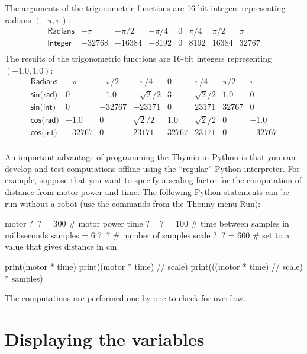 \documentclass[11pt,a4paper]{article}
\newcommand*{\bu}[1]{\textsf{\small #1}}
\begin{document}
The arguments of the trigonometric functions are 16-bit integers representing radians $(-\pi,\pi)$:
\[
\renewcommand*{\arraystretch}{1.3}
\begin{array}{lccccccc}
\textsf{Radians}&-\pi&-\pi/2&-\pi/4&0&\pi/4&\pi/2&\pi\\\hline
\textsf{Integer}&-32768&-16384&-8192&0&8192&16384&32767\\
\end{array}
\]
The results of the trigonometric functions are 16-bit integers representing $(-1.0,1.0)$:
\[
\renewcommand*{\arraystretch}{1.3}
\begin{array}{lccccccc}
\textsf{Radians}&-\pi&-\pi/2&-\pi/4&0&\pi/4&\pi/2&\pi\\\hline
\textsf{sin(rad)} & 0 & -1.0 & -\sqrt{2}/{2} & 3 & \sqrt{2}/{2} & 1.0& 0\\
\textsf{sin(int)}&0&-32767&-23171&0&23171&32767&0\\\hline
\textsf{cos(rad)} & -1.0 & 0 & \sqrt{2}/{2} & 1.0 & \sqrt{2}/{2} & 0& -1.0\\
\textsf{cos(int)}&-32767&0&23171&32767&23171&0&-32767\\
\end{array}
\]

An important advantage of programming the Thymio in Python is that you can develop and test computations offline using the ``regular'' Python interpreter. For example, suppose that you want to specify a scaling factor for the computation of distance from motor power and time. The following Python statements can be run without a robot (use the commands from the Thonny menu \bu{Run}):

\newpage

\begin{prog}
motor  ?$\;\;$? = 300     # motor power
time   ?$\quad\:$? = 100    # time between samples in milliseconds
samples = 6      ?$\;\;$? # number of samples
scale  ?$\;\;$?  = 600    # set to a value that gives distance in cm

print(motor * time)
print((motor * time) // scale)
print(((motor * time) // scale) * samples)
\end{prog}
The computations are performed one-by-one to check for overflow.

\section{Displaying the variables}\label{s.variables}
\end{document}
